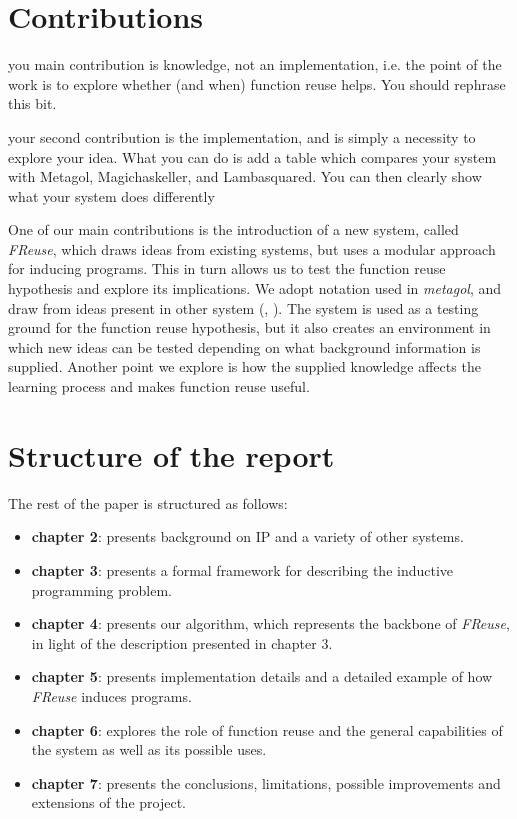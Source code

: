 \section{Contributions}

\ac{you main contribution is knowledge, not an implementation, i.e. the point of the work is to explore whether (and when) function reuse helps.
You should rephrase this bit.
}

\ac{your second contribution is the implementation, and is simply a necessity to explore your idea.
What you can do is add a table which compares your system with Metagol, Magichaskeller, and Lambasquared.
You can then clearly show what your system does differently
}

\indent \indent One of our main contributions is the introduction of a new system, called \textit{FReuse}, which draws ideas from existing systems, but uses a modular approach for inducing programs. This in turn allows us to test the function reuse hypothesis and explore its implications. We adopt notation used in \textit{metagol}, and draw from ideas present in other system (\cite{lambdasq}, \cite{mhask}). The system is used as a testing ground for the function reuse hypothesis, but it also creates an environment in which new ideas can be tested depending on what background information is supplied. Another point we explore is how the supplied knowledge affects the learning process and makes function reuse useful.

\section{Structure of the report}
\indent \indent The rest of the paper is structured as follows:
\begin{itemize}
\item \textbf{chapter 2}: presents background on IP and a variety of other systems.
\item \textbf{chapter 3}: presents a formal framework for describing the inductive programming problem.
\item \textbf{chapter 4}: presents our algorithm, which represents the backbone of \textit{FReuse}, in light of the description presented in chapter 3.
\item \textbf{chapter 5}: presents implementation details and a detailed example of how \textit{FReuse} induces programs.
\item \textbf{chapter 6}: explores the role of function reuse and the general capabilities of the system as well as its possible uses.
\item \textbf{chapter 7}: presents the conclusions, limitations, possible improvements and extensions of the project.
\end{itemize}


